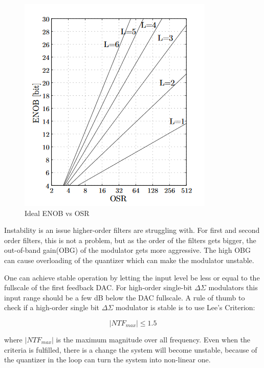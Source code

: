 \begin{figure}
\begin{minipage}[c]{0.5\linewidth}
\includegraphics[width=\linewidth]{images/ENOB_vs_SQNR.png}
\caption{Ideal ENOB vs OSR\cite{SQNR}}
\label{fig:ENOB}
\end{minipage}%
\end{figure}

Instability is an issue higher-order filters are struggling with. For first and second order filters, this is not a problem, but as the order of the filters gets bigger, the out-of-band gain(OBG) of the modulator gets more aggressive. The high OBG can cause overloading of the quantizer which can make the modulator unstable. 

One can achieve stable operation by letting the input level be less or equal to the fullscale of the first feedback DAC. For high-order single-bit $\Delta\Sigma$ modulators this input range should be a few dB below the DAC fullscale\cite[Chapter 4.2]{Richard}. A rule of thumb to check if a high-order single bit $\Delta\Sigma$ modulator is stable is to use Lee's Criterion\cite{Lee}:

\begin{equation}
    |NTF_{max}| \leq 1.5
\end{equation}

where $|NTF_{max}|$ is the maximum magnitude over all frequency. Even when the criteria is fulfilled, there is a change the system will become unstable, because of the quantizer in the loop can turn the system into non-linear one\cite{Richard}. 

